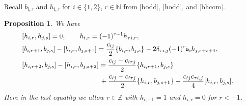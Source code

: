 \documentclass[11pt,reqno]{amsart}
\numberwithin{equation}{section}
\newtheorem{prop}[thm]{Proposition}
\theoremstyle{definition}
\theoremstyle{remark}
\newcommand{\bZ}{\mathbb{Z}}
\newcommand{\bN}{\mathbb{N}}
\newcommand{\ka}{{\mathfrak s}}
\begin{document}
Recall $b_{i,r}$ and $h_{i,r}$ for $i\in\{1,2\}$,  $r\in\bN$ from \eqref{bodd}, \eqref{hodd}, and \eqref{bhcom}.
\begin{prop}\label{X=3comp}
We have 
\begin{align}
&[h_{i,r},h_{j,s}]=0,\qquad h_{i,r}=(-1)^{r+1}h_{\tau i,r},\label{hhb3}\\
&[b_{i,r+1},b_{j,s}]  - [b_{i,r },b_{j,s+1 }]  =\frac{c_{ij}}{2}\{b_{i,r },b_{j,s}\}-2\delta_{\tau i, j} (-1)^{r}\ka_ih_{j,r+s+1 },\label{bbb3}\\
&[h_{i,r+2},b_{j,s}] - [h_{i,r},b_{j,s+2}]=\frac{c_{ij}-c_{i\tau j}}{2}\{h_{i,r+1},b_{j,s}\}\notag\\
&\qquad\qquad\qquad \qquad \qquad~~ \ \  +\frac{c_{ij}+c_{i\tau j}}{2} \{h_{i,r},b_{j,s+1}\}+\frac{c_{ij}c_{\tau i,j}}{4} [h_{i,r}, b_{j,s}].\label{hbb3}
\end{align}
Here in the last equality we allow $r\in\bZ$ with $h_{i,-1}=1$ and $h_{i,r}=0$ for $r<-1$.
\end{prop}
\end{document}
